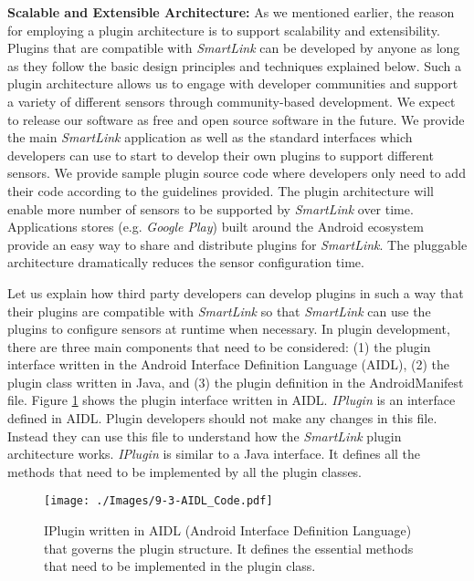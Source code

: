 \documentclass[graybox]{svmult}
\begin{document}
\textbf{Scalable and Extensible Architecture:} As we mentioned earlier, the reason for employing a plugin architecture is to support scalability and extensibility.  Plugins that are compatible with \textit{SmartLink} can be developed by anyone as long as they follow the basic design principles and techniques explained below. Such a plugin architecture allows us to engage with developer communities and support a variety of different sensors through community-based development. We expect to release our software as free and open source software in the future. We provide the main \textit{SmartLink} application as well as the standard interfaces which developers can use to start to develop their own plugins to support different sensors. We provide sample plugin source code where developers only need to add their code according to the guidelines provided. The plugin architecture  will enable more number of sensors to be supported by \textit{SmartLink} over time. Applications stores (e.g. \textit{ Google Play}) built around the Android ecosystem provide an easy way to share and distribute plugins for  \textit{SmartLink}. The pluggable architecture dramatically reduces the sensor configuration time.




Let us explain how third party developers can develop plugins in such a way that their plugins are compatible with \textit{SmartLink} so that \textit{SmartLink} can use the plugins to configure sensors at runtime when necessary. In plugin development, there are three main components that need to be considered: (1) the plugin interface written in the Android Interface Definition Language (AIDL), (2) the plugin class written in Java, and (3) the plugin definition in the AndroidManifest file. Figure \ref{Figure:AIDL_Code} shows the plugin interface written in AIDL. \textit{IPlugin} is an interface defined in AIDL. Plugin developers should not make any changes in this file. Instead they can use this file to understand how the \textit{SmartLink} plugin architecture works. \textit{IPlugin} is similar to a Java interface.  It defines all the methods that need to be implemented by all the plugin classes.





\begin{figure}[h]
 \centering
\texttt{[image: ./Images/9-3-AIDL\_Code.pdf]}
\caption{IPlugin written in AIDL (Android Interface Definition Language) that governs the plugin structure. It defines the essential methods that need to be implemented in the plugin class.}
 \label{Figure:AIDL_Code}	
\vspace{-0.33cm}	
\end{figure}
\end{document}
